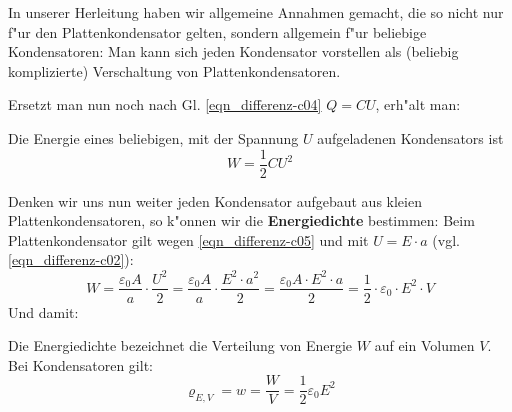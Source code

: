 In unserer Herleitung haben wir allgemeine Annahmen gemacht, die so
nicht nur f"ur den Plattenkondensator gelten, sondern allgemein f"ur
beliebige Kondensatoren: Man kann sich jeden Kondensator vorstellen
als (beliebig komplizierte) Verschaltung von Plattenkondensatoren.

Ersetzt man nun noch nach Gl. \eqref{eqn_differenz-c04} $Q = CU$, erh"alt man:
\begin{Wichtig}
   Die Energie eines beliebigen, mit der Spannung $U$ aufgeladenen
   Kondensators ist
   \begin{equation}
      \label{eqn_energie_kondensator}
      \boxed{  W = \frac{1}{2} C U^2  }
   \end{equation}
\end{Wichtig}

Denken wir uns nun weiter jeden Kondensator aufgebaut aus kleien
Plattenkondensatoren, so k"onnen wir die \textbf{Energiedichte}
bestimmen: Beim Plattenkondensator gilt wegen \eqref{eqn_differenz-c05} und mit
$U = E \cdot a$ (vgl. \eqref{eqn_differenz-c02}):
\begin{equation}
   \label{eqn_differenz-c27}
   W = \frac{\varepsilon_0 A}{a} \cdot \frac{U^2}{2}
=
 \frac{\varepsilon_0 A}{a} \cdot \frac{E^2 \cdot a^2}{2}
=
 \frac{\varepsilon_0 A \cdot E^2 \cdot a}{2}
=
\frac{1}{2} \cdot \varepsilon_0 \cdot E^2 \cdot V
\end{equation}
Und damit:
\begin{Def}
   \label{def_energiedichte} Die Energiedichte
    bezeichnet die Verteilung von Energie $W$ auf ein
   Volumen $V$. Bei Kondensatoren gilt:
   \begin{equation}
      \label{eqn_energiedichte_kondensator}
      \boxed{  \varrho_{E,V} = w = \frac{W}{V} = \frac{1}{2} \varepsilon_0
        E^2   }
   \end{equation}
\end{Def}

